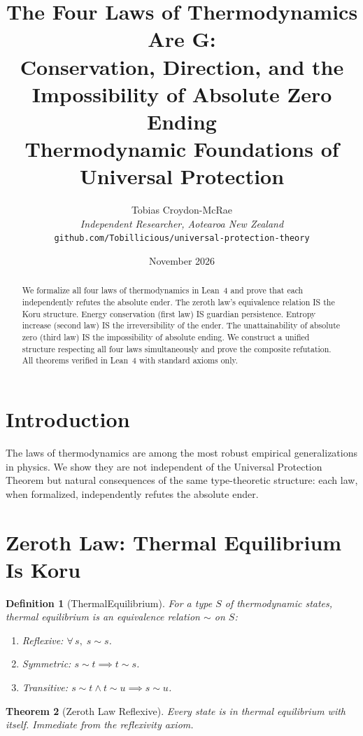 \documentclass[12pt,a4paper]{article}
\title{The Four Laws of Thermodynamics Are G:\\[0.3em]
Conservation, Direction, and the\\
Impossibility of Absolute Zero Ending\\[0.5em]
\large Thermodynamic Foundations of Universal Protection}
\author{Tobias Croydon-McRae\\
\textit{Independent Researcher, Aotearoa New Zealand}\\
\texttt{github.com/Tobillicious/universal-protection-theory}}
\date{November 2026}
\newtheorem{theorem}{Theorem}[section]
\newtheorem{definition}[theorem]{Definition}
\begin{document}
\maketitle

\begin{abstract}
We formalize all four laws of thermodynamics in Lean~4 and prove that
each independently refutes the absolute ender. The zeroth law's
equivalence relation IS the Koru structure. Energy conservation (first
law) IS guardian persistence. Entropy increase (second law) IS the
irreversibility of the ender. The unattainability of absolute zero
(third law) IS the impossibility of absolute ending. We construct a
unified structure respecting all four laws simultaneously and prove
the composite refutation. All theorems verified in Lean~4 with standard
axioms only.
\end{abstract}

\section{Introduction}

The laws of thermodynamics are among the most robust empirical
generalizations in physics. We show they are not independent of the
Universal Protection Theorem but natural consequences of the same
type-theoretic structure: each law, when formalized, independently
refutes the absolute ender.

\section{Zeroth Law: Thermal Equilibrium Is Koru}

\begin{definition}[ThermalEquilibrium]
For a type $S$ of thermodynamic states, thermal equilibrium is an
equivalence relation $\sim$ on $S$:
\begin{enumerate}
    \item Reflexive: $\forall\, s,\; s \sim s$.
    \item Symmetric: $s \sim t \implies t \sim s$.
    \item Transitive: $s \sim t \wedge t \sim u \implies s \sim u$.
\end{enumerate}
\end{definition}

\begin{theorem}[Zeroth Law Reflexive]\label{thm:zeroth-refl}
Every state is in thermal equilibrium with itself.
Immediate from the reflexivity axiom.
\end{theorem}
\end{document}
